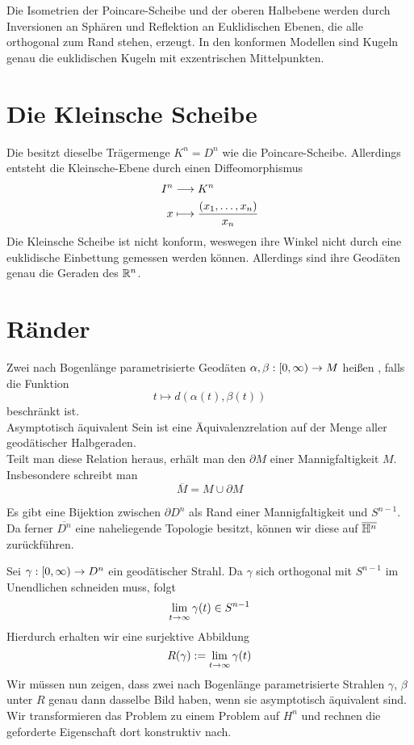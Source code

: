 \documentclass{book}
\begin{document}
\Prop{}
Die Isometrien der Poincare-Scheibe und der oberen Halbebene werden durch Inversionen an Sphären und Reflektion an Euklidischen Ebenen, die alle orthogonal zum Rand stehen, erzeugt.
\Prop{}
In den konformen Modellen sind Kugeln genau die euklidischen Kugeln mit exzentrischen Mittelpunkten.

\section{Die Kleinsche Scheibe}
\Def{}
Die  besitzt dieselbe Trägermenge $K^n = D^n$ wie die Poincare-Scheibe. Allerdings entsteht die Kleinsche-Ebene durch einen Diffeomorphismus
\begin{align*}
I^n & \overset{}{\longrightarrow} K^n\\
x & \longmapsto \frac{(x_1,\ldots,x_n)}{x_n}
\end{align*}
Die Kleinsche Scheibe ist nicht konform, weswegen ihre Winkel nicht durch eine euklidische Einbettung gemessen werden können. Allerdings sind ihre Geodäten genau die Geraden des $\mathbb{R}^n$.

\section{Ränder}
\Def{}
Zwei nach Bogenlänge parametrisierte Geodäten $\alpha, \beta : [0, \infty) \overset{}{\rightarrow} M$ heißen , falls die Funktion
\[ t \longmapsto d(\alpha(t), \beta(t)) \]
beschränkt ist.\\
Asymptotisch äquivalent Sein ist eine Äquivalenzrelation auf der Menge aller geodätischer Halbgeraden.\\
Teilt man diese Relation heraus, erhält man den  $\partial M$ einer Mannigfaltigkeit $M$. Insbesondere schreibt man
\[ \overline{M} = M \cup \partial M \]

\Prop{}
Es gibt eine Bijektion zwischen $\partial D^n$ als Rand einer Mannigfaltigkeit und $S^{n-1}$.\\
Da ferner $\overline{D^n}$ eine naheliegende Topologie besitzt, können wir diese auf $\overline{\mathbb{H}^n}$ zurückführen.
\begin{Beweis}{}
	Sei $\gamma : [0, \infty) \overset{}{\rightarrow} D^n$ ein geodätischer Strahl. Da $\gamma$ sich orthogonal mit $S^{n-1}$ im Unendlichen schneiden muss, folgt
	\[ \lim\limits_{t \overset{}{\rightarrow} \infty} \gamma(t) \in S^{n-1} \]
	Hierdurch erhalten wir eine surjektive Abbildung
	\[ R(\gamma) :=  \lim\limits_{t \overset{}{\rightarrow} \infty} \gamma(t) \]
	Wir müssen nun zeigen, dass zwei nach Bogenlänge parametrisierte Strahlen $\gamma$, $\beta$ unter $R$ genau dann dasselbe Bild haben, wenn sie asymptotisch äquivalent sind.\\
Wir transformieren das Problem zu einem Problem auf $H^n$ und rechnen die geforderte Eigenschaft dort konstruktiv nach.
\end{Beweis}
\end{document}
